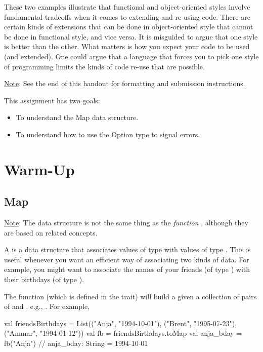\documentclass{book}
\begin{document}
These two examples illustrate that functional
and object-oriented styles involve fundamental tradeoffs when it comes
to extending and re-using code. There are certain kinds of extensions
that can be done in object-oriented style that cannot be done in
functional style, and vice versa.  It is misguided to argue that
one style is better than the other. What matters is how you expect your code
to be used (and extended). One could argue that a language that forces you to
pick one style of programming limits the kinds of code re-use that are possible.


\underline{Note}: See the end of this handout for formatting and submission instructions.

This assignment has two goals:

\begin{itemize}
  \item To understand the Map data structure.
  \item To understand how to use the Option type to signal errors.
\end{itemize}

\section{Warm-Up}

\subsection{Map}

\underline{Note}: The data structure  is not the same thing as the \emph{function} , although they are based on related concepts.

A  is a data structure that associates values of type  with values of type .  This is useful whenever you want an efficient way of associating two kinds of data.  For example, you might want to associate the names of your friends (of type ) with their birthdays (of type ).

The  function (which is defined in the  trait) will build a  given a collection of pairs of  and , e.g., .  For example,

\begin{scalacode}
val friendsBirthdays = List(("Anja", "1994-10-01"), ("Brent", "1995-07-23"), ("Ammar", "1994-01-12"))
val fb = friendsBirthdays.toMap
val anja_bday = fb("Anja")
// anja_bday: String = 1994-10-01
\end{scalacode}
\end{document}
